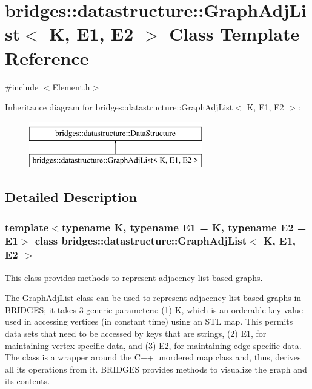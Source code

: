 \hypertarget{classbridges_1_1datastructure_1_1_graph_adj_list}{}\section{bridges\+:\+:datastructure\+:\+:Graph\+Adj\+List$<$ K, E1, E2 $>$ Class Template Reference}
\label{classbridges_1_1datastructure_1_1_graph_adj_list}


{\ttfamily \#include $<$Element.\+h$>$}

Inheritance diagram for bridges\+:\+:datastructure\+:\+:Graph\+Adj\+List$<$ K, E1, E2 $>$\+:\begin{figure}[H]
\begin{center}
\leavevmode
\includegraphics[height=2.000000cm]{classbridges_1_1datastructure_1_1_graph_adj_list}
\end{center}
\end{figure}


\subsection{Detailed Description}
\subsubsection*{template$<$typename K, typename E1 = K, typename E2 = E1$>$\newline
class bridges\+::datastructure\+::\+Graph\+Adj\+List$<$ K, E1, E2 $>$}

This class provides methods to represent adjacency list based graphs. 

The \hyperlink{classbridges_1_1datastructure_1_1_graph_adj_list}{Graph\+Adj\+List} class can be used to represent adjacency list based graphs in B\+R\+I\+D\+G\+ES; it takes 3 generic parameters\+: (1) K, which is an orderable key value used in accessing vertices (in constant time) using an S\+TL map. This permits data sets that need to be accessed by keys that are strings, (2) E1, for maintaining vertex specific data, and (3) E2, for maintaining edge specific data. The class is a wrapper around the C++ unordered map class and, thus, derives all its operations from it. B\+R\+I\+D\+G\+ES provides methods to visualize the graph and its contents.

